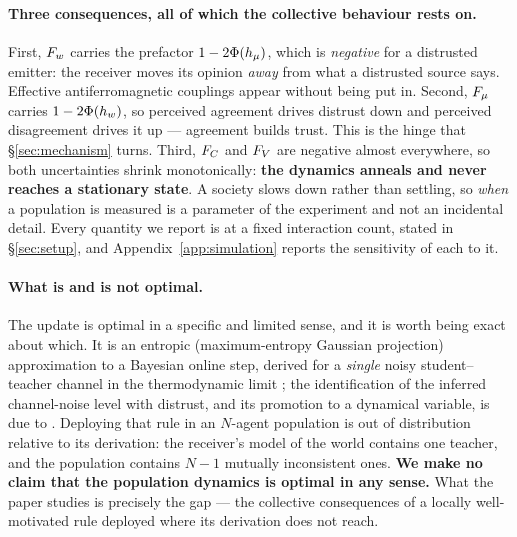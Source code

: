\paragraph{Three consequences, all of which the collective behaviour rests on.}
First, $F_{w}$ carries the prefactor $1-2\Phi(h_{\mu})$, which is \emph{negative} for
a distrusted emitter: the receiver moves its opinion \emph{away} from what a
distrusted source says. Effective antiferromagnetic couplings appear without
being put in. Second, $F_{\mu}$ carries $1-2\Phi(h_{w})$, so perceived agreement
drives distrust down and perceived disagreement drives it up --- agreement
builds trust. This is the hinge that \S\ref{sec:mechanism} turns. Third,
$F_{C}$ and $F_{V}$ are negative almost everywhere, so both uncertainties shrink
monotonically: \textbf{the dynamics anneals and never reaches a stationary
state}. A society slows down rather than settling, so \emph{when} a population
is measured is a parameter of the experiment and not an incidental detail. Every
quantity we report is at a fixed interaction count, stated in
\S\ref{sec:setup}, and Appendix~\ref{app:simulation} reports the sensitivity of
each to it.

\paragraph{What is and is not optimal.}
The update is optimal in a specific and limited sense, and it is worth being
exact about which. It is an entropic (maximum-entropy Gaussian projection)
approximation to a Bayesian online step, derived for a \emph{single} noisy
student--teacher channel in the thermodynamic limit
\citep{opper1996online,solla1999optimal,caticha2020entropic}; the identification
of the inferred channel-noise level with distrust, and its promotion to a
dynamical variable, is due to \citet{alves2016distrust}. Deploying that rule in
an $N$-agent population is out of distribution relative to its derivation: the
receiver's model of the world contains one teacher, and the population contains
$N-1$ mutually inconsistent ones. \textbf{We make no claim that the population
dynamics is optimal in any sense.} What the paper studies is precisely the gap
--- the collective consequences of a locally well-motivated rule deployed where
its derivation does not reach.
